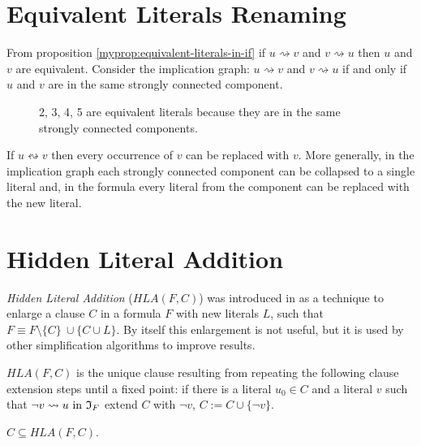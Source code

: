 \section{Equivalent Literals Renaming}

From proposition \ref{myprop:equivalent-literals-in-if} if $u \rightsquigarrow v$
and $v \rightsquigarrow u$ then $u$ and $v$ are equivalent.
Consider the implication graph: $u \rightsquigarrow v$ and $v \rightsquigarrow u$
if and only if $u$ and $v$ are in the same strongly connected component.

\begin{figure}[h]
  \centering
  \caption{2, 3, 4, 5 are equivalent literals because they are in the same
  strongly connected components.}
  \label{fig:equivalent}
\end{figure}

\begin{myprop}
  If $u \leftrightsquigarrow v$ then every occurrence of $v$ can be replaced
  with $v$. More generally, in the implication graph each strongly
  connected component can be collapsed to a single literal and, in
  the formula every literal from the component can be replaced with
  the new literal.
\end{myprop}


\section{Hidden Literal Addition}

\emph{Hidden Literal Addition} ($HLA(F, C)$) was introduced in
\cite{Heule:2010:CEP:1928380.1928406} as a technique to enlarge a clause $C$
in a formula $F$ with new literals $L$, such that $F \equiv F \setminus \{C\} \
\cup \{ C \cup L \}$. By itself this enlargement is not useful, but it
is used by other simplification algorithms to improve results.

\begin{mydef}
  $HLA(F, C)$ is the unique clause resulting from repeating the following
  clause extension steps until a fixed point: if there is a literal $u_0 \in C$
  and a literal $v$ such that $\neg v \rightsquigarrow u \text{ in } \mathfrak{I}_F$
  extend $C$ with $\neg v$, $C := C \cup \{ \neg v \}$.
\end{mydef}

\begin{myprop}
  $C \subseteq HLA(F, C)$.
\end{myprop}

